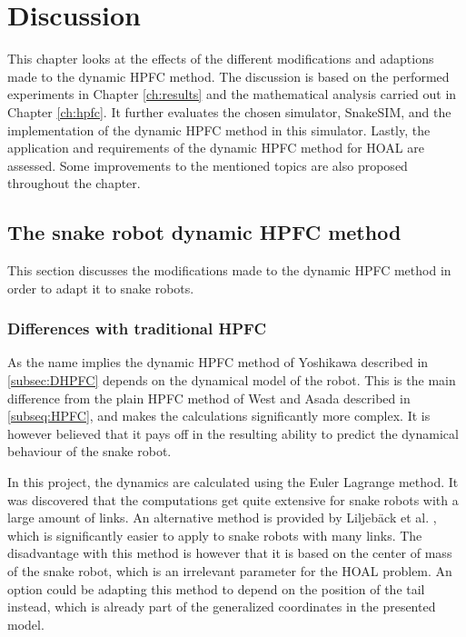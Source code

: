 \chapter{Discussion}\label{ch:discussion}

This chapter looks at the effects of the different modifications and adaptions made to the dynamic HPFC method. The discussion is based on the performed experiments in Chapter \ref{ch:results} and the mathematical analysis carried out in Chapter \ref{ch:hpfc}. It further evaluates the chosen simulator, SnakeSIM, and the implementation of the dynamic HPFC method in this simulator. Lastly, the application and requirements of the dynamic HPFC method for HOAL are assessed. Some improvements to the mentioned topics are also proposed throughout the chapter.

\section{The snake robot dynamic HPFC method}

This section discusses the modifications made to the dynamic HPFC method in order to adapt it to snake robots.

\subsection{Differences with traditional HPFC}\label{subsec:dis-diff}

As the name implies the dynamic HPFC method of Yoshikawa \cite{yoshikawa1987dynamic} described in \ref{subsec:DHPFC} depends on the dynamical model of the robot. This is the main difference from the plain HPFC method of West and Asada \cite{west1985method} described in \ref{subseq:HPFC}, and makes the calculations significantly more complex. It is however believed that it pays off in the resulting ability to predict the dynamical behaviour of the snake robot.

In this project, the dynamics are calculated using the Euler Lagrange method. It was discovered that the computations get quite extensive for snake robots with a large amount of links. An alternative method is provided by Liljebäck et al. \cite{liljeback2012snake}, which is significantly easier to apply to snake robots with many links. The disadvantage with this method is however that it is based on the center of mass of the snake robot, which is an irrelevant parameter for the HOAL problem.%
An option could be adapting this method to depend on the position of the tail instead, which is already part of the generalized coordinates in the presented model.

